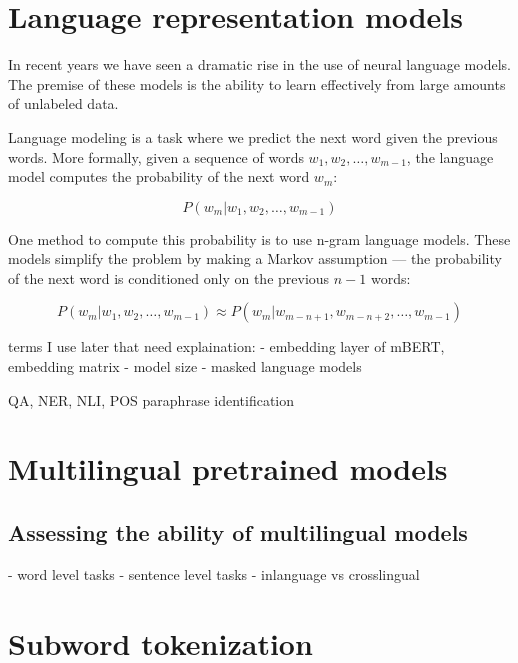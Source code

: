 \section{Language representation models}

In recent years we have seen a dramatic rise in the use of neural language models. The premise of these models is the ability to learn effectively from large amounts of unlabeled data. 


Language modeling is a task where we predict the next word given the previous words. \cite{manning_foundations_1999} More formally, given a sequence of words $w_1, w_2, \dots, w_{m-1}$, the language model computes the probability of the next word $w_{m}$:

\begin{equation}
    P(w_{m} | w_1, w_2, \dots, w_{m-1})
\end{equation}

One method to compute this probability is to use n-gram language models. These models simplify the problem by making a Markov assumption --- the probability of the next word is conditioned only on the previous $n-1$ words:

\begin{equation}
    P(w_{m} | w_1, w_2, \dots, w_{m-1}) \approx P(w_{m} | w_{m-n+1}, w_{m-n+2}, \dots, w_{m-1})
\end{equation}


terms I use later that need explaination:
- embedding layer of mBERT, embedding matrix
- model size
- masked language models

QA, NER, NLI, POS
paraphrase identification

\section{Multilingual pretrained models}


\subsection{Assessing the ability of multilingual models}

- word level tasks
- sentence level tasks
- inlanguage vs crosslingual

\section{Subword tokenization}

